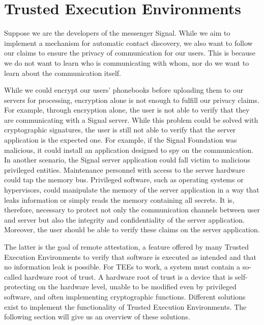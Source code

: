 \section{Trusted Execution Environments}
\label{sec:state:tee}

Suppose we are the developers of the messenger Signal. While we aim to implement
a mechanism for automatic contact discovery, we also want to follow our claims
to ensure the privacy of communication for our users. This is because we do not
want to learn who is communicating with whom, nor do we want to learn about the
communication itself.

While we could encrypt our users' phonebooks before uploading them to our
servers for processing, encryption alone is not enough to fulfill our privacy
claims. For example, through encryption alone, the user is not able to verify
that they are communicating with a Signal server. While this problem could be
solved with cryptographic signatures, the user is still not able to verify that
the server application is the expected one. For example, if the Signal
Foundation was malicious, it could install an application designed to spy on the
communication. In another scenario, the Signal server application could fall
victim to malicious privileged entities. Maintenance personnel with access to
the server hardware could tap the memory bus. Privileged software, such as
operating systems or hypervisors, could manipulate the memory of the server
application in a way that leaks information or simply reads the memory
containing all secrets. It is, therefore, necessary to protect not only the
communication channels between user and server but also the integrity and
confidentiality of the server application. Moreover, the user should be able to
verify these claims on the server application.

The latter is the goal of remote attestation, a feature offered by many Trusted
Execution Environments to verify that software is executed as intended and that
no information leak is possible. For TEEs to work, a system must contain a
so-called hardware root of trust. A hardware root of trust is a device that is
self-protecting on the hardware level, unable to be modified even by privileged
software, and often implementing cryptographic functions. Different solutions
exist to implement the functionality of Trusted Execution Environments. The
following section will give us an overview of these solutions.

